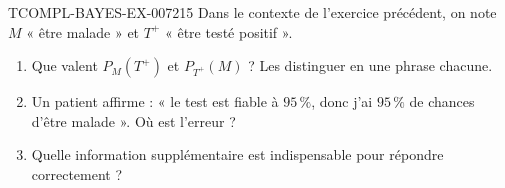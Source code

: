 \begin{exercice}{TCOMPL-BAYES-EX-007}{2}{15}
Dans le contexte de l'exercice précédent, on note $M$ « être malade » et
$T^+$ « être testé positif ».
\begin{enumerate}
  \item Que valent $P_M(T^+)$ et $P_{T^+}(M)$ ? Les distinguer en une phrase
        chacune.
  \item Un patient affirme : « le test est fiable à $95\,\%$, donc j'ai
        $95\,\%$ de chances d'être malade ». Où est l'erreur ?
  \item Quelle information supplémentaire est indispensable pour répondre
        correctement ?
\end{enumerate}
\end{exercice}
